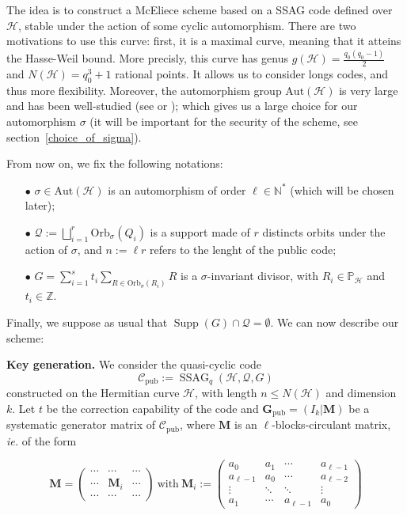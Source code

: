 \documentclass[10pt]{article}
\theoremstyle{definition}
\theoremstyle{definition}
\theoremstyle{definition}
\newcommand{\N}{\mathbb{N}}
\newcommand{\Z}{\mathbb{Z}}
\newcommand{\PP}{\mathbb{P}}
\newcommand{\calH}{\mathcal{H}}
\newcommand{\QR}{\mathcal{Q}}
\newcommand{\Supp}{\operatorname{Supp}}
\newcommand{\ssag}{\operatorname{SSAG}}
\begin{document}
The idea is to construct a McEliece scheme based on a SSAG code defined over $\calH$, stable under the action of some cyclic automorphism. There are two motivations to use this curve: first, it is a maximal curve,  meaning that it atteins the Hasse-Weil bound. More precisly, this curve has genus $g(\calH)= \frac{q_0(q_0-1)}{2}$ and $N(\calH)=q_0^3+1$ rational points. It allows us to consider longs codes, and thus more flexibility. Moreover, the automorphism group $\mathrm{Aut}(\mathcal{H})$ is very large and has been well-studied (see \cite{Sti} or \cite{Gar}); which gives us a large choice for our automorphism $\sigma$ (it will be important for the security of the scheme, see section~\ref{choice_of_sigma}). 

\vspace*{0.2cm}

\noindent From now on, we fix the following notations: 
\begin{enumerate}
\item[$\bullet$] $\sigma \in \mathrm{Aut}(\calH)$ is an automorphism of order $\ell \in \N^*$ (which will be chosen later);
\item[$\bullet$] $\QR := \bigsqcup\limits_{i=1}^{r} \mathrm{Orb}_{\sigma}(Q_i)$ is a support made of $r$ distincts orbits under the action of $\sigma$, and $n:=\ell r$ refers to the lenght of the public code;
\item[$\bullet$] $G = \sum\limits_{i=1}^s t_i \sum\limits_{R \in \mathrm{Orb}_{\sigma}(R_i)} R$ is a $\sigma$-invariant divisor, with $R_i \in \PP_{\mathcal{H}}$ and $t_i \in \Z$. 
\end{enumerate}

Finally, we suppose as usual that $\Supp(G)\cap \QR = \emptyset$. We can now describe our scheme: 

\vspace*{0.2cm}

\noindent \textbf{Key generation.} We consider the quasi-cyclic code 
\[\mathcal{C}_{\mathrm{pub}} := \ssag_q(\mathcal{H},\QR,G)\]
constructed on the Hermitian curve $\mathcal{H}$, with length $n \leq N(\mathcal{H})$ and dimension $k$. Let $t$ be the correction capability of the code and $\mathbf{G}_{\mathrm{pub}} = (I_k | \mathbf{M})$ be a systematic generator matrix of $\mathcal{C}_{\mathrm{pub}}$, where $\mathbf{M}$ is an $\ell$-blocks-circulant matrix, \textit{ie.} of the form 

\begin{equation*}
\mathbf{M}= \begin{pmatrix}
\cdots & \cdots & \cdots \\
\cdots & \mathbf{M}_i & \cdots \\
\cdots & \cdots & \cdots
\end{pmatrix}
\ \mathrm{with} \ \mathbf{M}_i := \begin{pmatrix}
a_0 & a_1 & \cdots & a_{\ell-1} \\
a_{\ell-1} & a_0 & \cdots & a_{\ell-2} \\
\vdots & \ddots & \ddots & \vdots \\
a_1 & \cdots & a_{\ell-1} & a_0 
\end{pmatrix}
\end{equation*}
\end{document}
